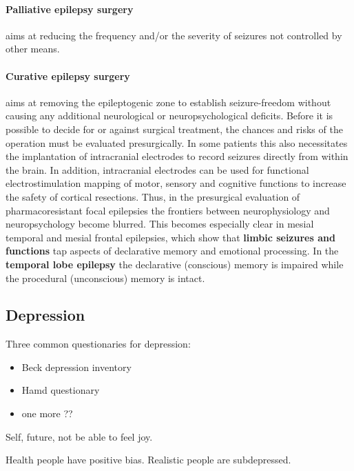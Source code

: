 \documentclass[12pt,article,oneside,a4paper]{memoir}
\begin{document}
\paragraph{Palliative epilepsy surgery} aims at reducing the frequency and/or the severity of seizures not controlled by other means.

\paragraph{Curative epilepsy surgery} aims at removing the epileptogenic zone to establish seizure-freedom without causing any additional neurological or neuropsychological deficits.
Before it is possible to decide for or against surgical treatment, the chances and risks of the operation must be evaluated presurgically. In some patients this also necessitates the implantation of intracranial electrodes to record seizures directly from within the brain. In addition, intracranial electrodes can be used for functional electrostimulation mapping of motor, sensory and cognitive functions to increase the safety of cortical resections.
Thus, in the presurgical evaluation of pharmacoresistant focal epilepsies the frontiers between neurophysiology and neuropsychology become blurred. This becomes especially clear in mesial temporal and mesial frontal epilepsies, which show that \textbf{limbic seizures and functions} tap aspects of declarative memory and emotional processing.
In the \textbf{temporal lobe epilepsy} the declarative (conscious) memory is impaired while the procedural (unconscious) memory is intact.

\newpage
\subsection{Depression}

Three common questionaries for depression:
\begin{itemize}
\item Beck depression inventory
\item Hamd questionary
\item one more ??
\end{itemize}

Self, future, not be able to feel joy.

Health people have positive bias. Realistic people are subdepressed.

\newpage
\end{document}
